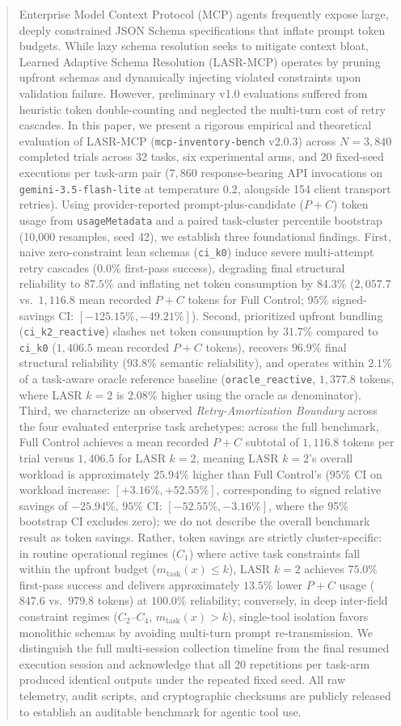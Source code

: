 \begin{abstract}
Enterprise Model Context Protocol (MCP) agents frequently expose large, deeply constrained JSON Schema specifications that inflate prompt token budgets. While lazy schema resolution seeks to mitigate context bloat, Learned Adaptive Schema Resolution (LASR-MCP) operates by pruning upfront schemas and dynamically injecting violated constraints upon validation failure. However, preliminary v1.0 evaluations suffered from heuristic token double-counting and neglected the multi-turn cost of retry cascades. In this paper, we present a rigorous empirical and theoretical evaluation of LASR-MCP (\texttt{mcp-inventory-bench} v2.0.3) across $N=3,840$ completed trials across 32 tasks, six experimental arms, and 20 fixed-seed executions per task-arm pair ($7,860$ response-bearing API invocations on \texttt{gemini-3.5-flash-lite} at temperature $0.2$, alongside 154 client transport retries). Using provider-reported prompt-plus-candidate ($P+C$) token usage from \texttt{usageMetadata} and a paired task-cluster percentile bootstrap (10,000 resamples, seed 42), we establish three foundational findings. First, naive zero-constraint lean schemas (\texttt{ci\_k0}) induce severe multi-attempt retry cascades ($0.0\%$ first-pass success), degrading final structural reliability to $87.5\%$ and inflating net token consumption by $84.3\%$ ($2,057.7$ vs.\ $1,116.8$ mean recorded $P+C$ tokens for Full Control; $95\%$ signed-savings CI: $[-125.15\%, -49.21\%]$). Second, prioritized upfront bundling (\texttt{ci\_k2\_reactive}) slashes net token consumption by $31.7\%$ compared to \texttt{ci\_k0} ($1,406.5$ mean recorded $P+C$ tokens), recovers $96.9\%$ final structural reliability ($93.8\%$ semantic reliability), and operates within $2.1\%$ of a task-aware oracle reference baseline (\texttt{oracle\_reactive}, $1,377.8$ tokens, where LASR $k=2$ is $2.08\%$ higher using the oracle as denominator). Third, we characterize an observed \emph{Retry-Amortization Boundary} across the four evaluated enterprise task archetypes: across the full benchmark, Full Control achieves a mean recorded $P+C$ subtotal of $1,116.8$ tokens per trial versus $1,406.5$ for LASR $k=2$, meaning LASR $k=2$'s overall workload is approximately $25.94\%$ higher than Full Control's ($95\%$ CI on workload increase: $[+3.16\%, +52.55\%]$, corresponding to signed relative savings of $-25.94\%$, $95\%$ CI: $[-52.55\%, -3.16\%]$, where the 95\% bootstrap CI excludes zero); we do not describe the overall benchmark result as token savings. Rather, token savings are strictly cluster-specific: in routine operational regimes ($C_1$) where active task constraints fall within the upfront budget ($m_{\text{task}}(x) \le k$), LASR $k=2$ achieves $75.0\%$ first-pass success and delivers approximately $13.5\%$ lower $P+C$ usage ($847.6$ vs.\ $979.8$ tokens) at $100.0\%$ reliability; conversely, in deep inter-field constraint regimes ($C_2$--$C_4$, $m_{\text{task}}(x) > k$), single-tool isolation favors monolithic schemas by avoiding multi-turn prompt re-transmission. We distinguish the full multi-session collection timeline from the final resumed execution session and acknowledge that all 20 repetitions per task-arm produced identical outputs under the repeated fixed seed. All raw telemetry, audit scripts, and cryptographic checksums are publicly released to establish an auditable benchmark for agentic tool use.
\end{abstract}
